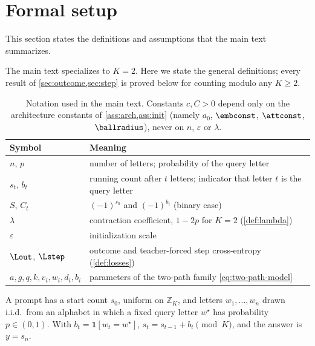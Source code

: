 \providecommand{\reg}[1]{\ensuremath{\mathsf{#1}}}

\section{Formal setup}
\label{app:formal}

This section states the definitions and assumptions that the main text summarizes.

\label{app:setup}
The main text specializes to $K=2$. Here we state the general definitions; every result of
\cref{sec:outcome,sec:step} is proved below for counting modulo any $K\ge2$.

\begin{table}[H]
\centering\small
\caption{Notation used in the main text. Constants $c,C>0$ depend only on the architecture constants of
\cref{ass:arch,ass:init} (namely $a_0$, $\embconst$, $\attconst$, $\ballradius$), never on $n$, $\varepsilon$ or $\lambda$.}
\label{tab:notation}
\begin{tabular}{@{}ll@{}}
\toprule
Symbol & Meaning\\
\midrule
$n$, $p$ & number of letters; probability of the query letter\\
$s_t$, $b_t$ & running count after $t$ letters; indicator that letter $t$ is the query letter\\
$S$, $C_t$ & $(-1)^{s_0}$ and $(-1)^{b_t}$ (binary case)\\
$\lambda$ & contraction coefficient, $1-2p$ for $K=2$ (\cref{def:lambda})\\
$\varepsilon$ & initialization scale\\
$\Lout$, $\Lstep$ & outcome and teacher-forced step cross-entropy (\cref{def:losses})\\
$a,g,q,k,v_i,w_i,d_i,b_i$ & parameters of the two-path family \cref{eq:two-path-model}\\
\bottomrule
\end{tabular}
\end{table}

\begin{definition}
\label{def:task}
A prompt has a start count $s_0$, uniform on $\mathbb Z_K$, and letters $w_1,\ldots,w_n$ drawn i.i.d.\ from an alphabet
in which a fixed query letter $w^\star$ has probability $p\in(0,1)$. With $b_t=\mathbf 1[w_t=w^\star]$,
$s_t=s_{t-1}+b_t\pmod K$, and the answer is $y=s_n$.
\end{definition}


